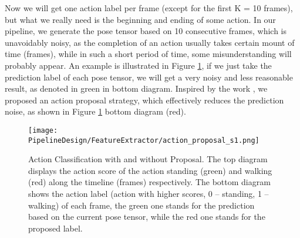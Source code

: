 Now we will get one action label per frame (except for the first K = 10 frames), but what we really need is the beginning and ending of some action. In our pipeline, we generate the pose tensor based on 10 consecutive frames, which is unavoidably noisy, as the completion of an action usually takes certain mount of time (frames), while in such a short period of time, some misunderstanding will probably appear. An example is illustrated in Figure \ref{fig:action_proposal_s1}, if we just take the prediction label of each pose tensor, we will get a very noisy and less reasonable result, as denoted in green in bottom diagram. Inspired by the work \cite{DBLP:journals/corr/XiongZWLT17}, we proposed an action proposal strategy, which effectively reduces the prediction noise, as shown in Figure \ref{fig:action_proposal_s1} bottom diagram (red).      

\begin{figure}[H]
  \centering
  \texttt{[image: PipelineDesign/FeatureExtractor/action\_proposal\_s1.png]}
  \caption{Action Classification with and without Proposal. The top diagram displays the action score
           of the action standing (green) and walking (red) along the timeline (frames) respectively. 
           The bottom diagram shows the action label (action with higher scores, 0 -- standing, 1 --
           walking) of each frame, the green one stands for the prediction based on the current pose
           tensor, while the red one stands for the proposed label.}  
  \label{fig:action_proposal_s1}
\end{figure}   

